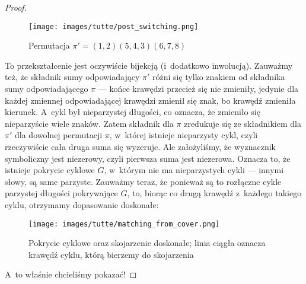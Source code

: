 \begin{proof}
	\begin{figure}[H]
		\centering
		\texttt{[image: images/tutte/post\_switching.png]}
		\caption{Permutacja \(\pi' = (1, 2)(5, 4, 3)(6, 7, 8)\)}
	\end{figure}

	To przekształcenie jest oczywiście bijekcją (i~dodatkowo inwolucją). Zauważmy też, że składnik sumy odpowiadający \(\pi'\) różni się tylko znakiem od składnika sumy odpowiadającego \(\pi\) --- końce krawędzi przecież się nie zmieniły, jedynie dla każdej zmiennej odpowiadającej krawędzi zmienił się znak, bo krawędź zmieniła kierunek. A~cykl był nieparzystej długości, co oznacza, że zmieniło się nieparzyście wiele znaków. Zatem składnik dla \(\pi\) zredukuje się ze składnikiem dla \(\pi'\) dla dowolnej permutacji \(\pi\), w~której istnieje nieparzysty cykl, czyli rzeczywiście cała druga suma się wyzeruje. Ale założyliśmy, że wyznacznik symboliczny jest niezerowy, czyli pierwsza suma jest niezerowa. Oznacza to, że istnieje pokrycie cyklowe \(G\), w~którym nie ma nieparzystych cykli --- innymi słowy, są same parzyste. Zauważmy teraz, że ponieważ są to rozłączne cykle parzystej długości pokrywające \(G\), to, biorąc co drugą krawędź z~każdego takiego cyklu, otrzymamy dopasowanie doskonałe:

	\begin{figure}[H]
		\centering
		\texttt{[image: images/tutte/matching\_from\_cover.png]}
		\caption{Pokrycie cyklowe oraz skojarzenie doskonałe; linia ciągła oznacza krawędź cyklu, którą bierzemy do skojarzenia }
	\end{figure}

	A~to właśnie chcieliśmy pokazać!
\end{proof}
